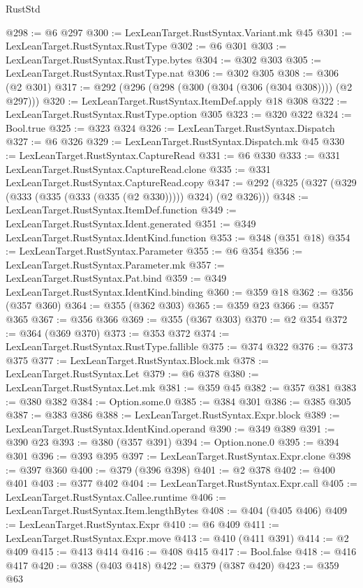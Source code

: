 \begin{lexlean}{RustStd}
\begin{coremodule}
@298 := @6 @297
@300 := LexLeanTarget.RustSyntax.Variant.mk @45
@301 := LexLeanTarget.RustSyntax.RustType
@302 := @6 @301
@303 := LexLeanTarget.RustSyntax.RustType.bytes
@304 := @302 @303
@305 := LexLeanTarget.RustSyntax.RustType.nat
@306 := @302 @305
@308 := @306 (@2 @301)
@317 := @292 (@296 (@298 (@300 (@304 (@306 (@304 @308)))) (@2 @297)))
@320 := LexLeanTarget.RustSyntax.ItemDef.apply @18 @308
@322 := LexLeanTarget.RustSyntax.RustType.option @305
@323 := @320 @322
@324 := Bool.true
@325 := @323 @324
@326 := LexLeanTarget.RustSyntax.Dispatch
@327 := @6 @326
@329 := LexLeanTarget.RustSyntax.Dispatch.mk @45
@330 := LexLeanTarget.RustSyntax.CaptureRead
@331 := @6 @330
@333 := @331 LexLeanTarget.RustSyntax.CaptureRead.clone
@335 := @331 LexLeanTarget.RustSyntax.CaptureRead.copy
@347 := @292 (@325 (@327 (@329 (@333 (@335 (@333 (@335 (@2 @330))))) @324) (@2 @326)))
@348 := LexLeanTarget.RustSyntax.ItemDef.function
@349 := LexLeanTarget.RustSyntax.Ident.generated
@351 := @349 LexLeanTarget.RustSyntax.IdentKind.function
@353 := @348 (@351 @18)
@354 := LexLeanTarget.RustSyntax.Parameter
@355 := @6 @354
@356 := LexLeanTarget.RustSyntax.Parameter.mk
@357 := LexLeanTarget.RustSyntax.Pat.bind
@359 := @349 LexLeanTarget.RustSyntax.IdentKind.binding
@360 := @359 @18
@362 := @356 (@357 @360)
@364 := @355 (@362 @303)
@365 := @359 @23
@366 := @357 @365
@367 := @356 @366
@369 := @355 (@367 @303)
@370 := @2 @354
@372 := @364 (@369 @370)
@373 := @353 @372
@374 := LexLeanTarget.RustSyntax.RustType.fallible
@375 := @374 @322
@376 := @373 @375
@377 := LexLeanTarget.RustSyntax.Block.mk
@378 := LexLeanTarget.RustSyntax.Let
@379 := @6 @378
@380 := LexLeanTarget.RustSyntax.Let.mk
@381 := @359 @45
@382 := @357 @381
@383 := @380 @382
@384 := Option.some.{0}
@385 := @384 @301
@386 := @385 @305
@387 := @383 @386
@388 := LexLeanTarget.RustSyntax.Expr.block
@389 := LexLeanTarget.RustSyntax.IdentKind.operand
@390 := @349 @389
@391 := @390 @23
@393 := @380 (@357 @391)
@394 := Option.none.{0}
@395 := @394 @301
@396 := @393 @395
@397 := LexLeanTarget.RustSyntax.Expr.clone
@398 := @397 @360
@400 := @379 (@396 @398)
@401 := @2 @378
@402 := @400 @401
@403 := @377 @402
@404 := LexLeanTarget.RustSyntax.Expr.call
@405 := LexLeanTarget.RustSyntax.Callee.runtime
@406 := LexLeanTarget.RustSyntax.Item.lengthBytes
@408 := @404 (@405 @406)
@409 := LexLeanTarget.RustSyntax.Expr
@410 := @6 @409
@411 := LexLeanTarget.RustSyntax.Expr.move
@413 := @410 (@411 @391)
@414 := @2 @409
@415 := @413 @414
@416 := @408 @415
@417 := Bool.false
@418 := @416 @417
@420 := @388 (@403 @418)
@422 := @379 (@387 @420)
@423 := @359 @63

\end{coremodule}
\end{lexlean}
